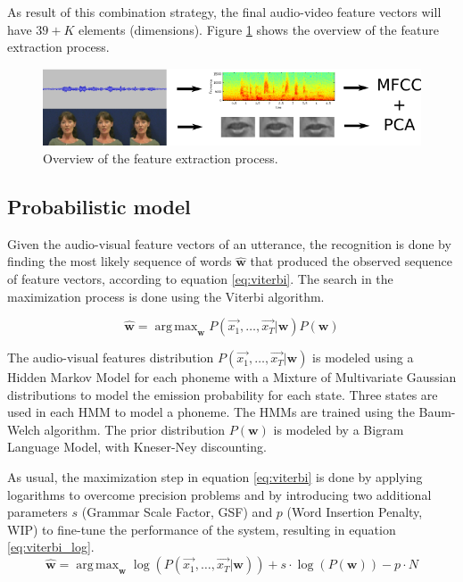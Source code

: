 \documentclass[12pt,a4paper]{article}
\DeclareMathOperator*{\argmax}{arg\,max}
\begin{document}
As result of this combination strategy, the final audio-video feature vectors will have $39+K$ elements (dimensions). Figure \ref{fig:feature_extraction} shows the overview of the feature extraction process.

\begin{figure}
\includegraphics[width=\textwidth]{multimodal_overview.png}
\caption{Overview of the feature extraction process.}
\label{fig:feature_extraction}
\end{figure}

\subsection{Probabilistic model}
Given the audio-visual feature vectors of an utterance, the recognition is done by finding the most likely sequence of words $\mathbf{\hat{w}}$ that produced the observed sequence of feature vectors, according to equation \ref{eq:viterbi}. The search in the maximization process is done using the Viterbi algorithm.

\begin{equation}\label{eq:viterbi}
\mathbf{\hat{w}} = \argmax_{\mathbf{w}} P(\vec{x_1}, \ldots, \vec{x_T}|\mathbf{w}) P(\mathbf{w})
\end{equation}

The audio-visual features distribution $P(\vec{x_1}, \ldots, \vec{x_T}|\mathbf{w})$ is modeled using a Hidden Markov Model for each phoneme with a Mixture of Multivariate Gaussian distributions to model the emission probability for each state. Three states are used in each HMM to model a phoneme. The HMMs are trained using the Baum-Welch algorithm. The prior distribution $P(\mathbf{w})$ is modeled by a Bigram Language Model, with Kneser-Ney discounting.

As usual, the maximization step in equation \ref{eq:viterbi} is done by applying logarithms to overcome precision problems and by introducing two additional parameters $s$ (Grammar Scale Factor, GSF) and $p$ (Word Insertion Penalty, WIP) to fine-tune the performance of the system, resulting in equation \ref{eq:viterbi_log}.
\begin{equation}\label{eq:viterbi_log}
\mathbf{\hat{w}} = \argmax_{\mathbf{w}} \log(P(\vec{x_1}, \ldots, \vec{x_T}|\mathbf{w})) + s \cdot \log(P(\mathbf{w})) - p \cdot N
\end{equation}
\end{document}
